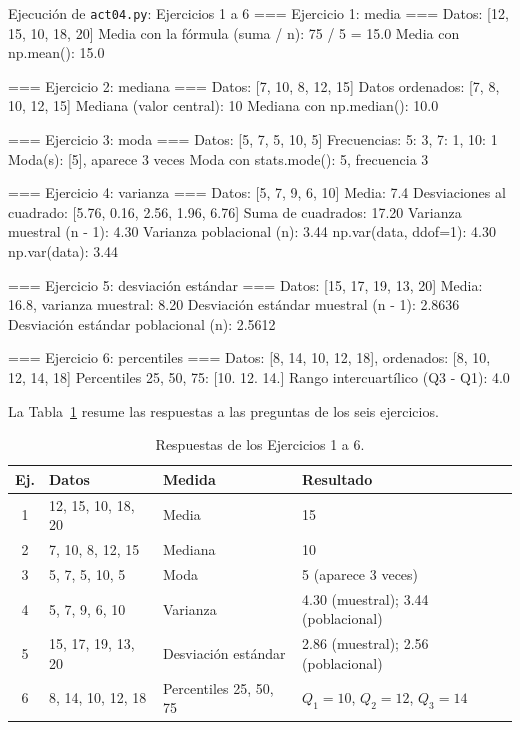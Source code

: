\documentclass[11pt,letterpaper]{article}
\begin{document}
\begin{consola}[label=out:ej16]{Ejecución de \texttt{act04.py}: Ejercicios 1 a 6}
=== Ejercicio 1: media ===
Datos: [12, 15, 10, 18, 20]
Media con la fórmula (suma / n): 75 / 5 = 15.0
Media con np.mean(): 15.0

=== Ejercicio 2: mediana ===
Datos: [7, 10, 8, 12, 15]
Datos ordenados: [7, 8, 10, 12, 15]
Mediana (valor central): 10
Mediana con np.median(): 10.0

=== Ejercicio 3: moda ===
Datos: [5, 7, 5, 10, 5]
Frecuencias: {5: 3, 7: 1, 10: 1}
Moda(s): [5], aparece 3 veces
Moda con stats.mode(): 5, frecuencia 3

=== Ejercicio 4: varianza ===
Datos: [5, 7, 9, 6, 10]
Media: 7.4
Desviaciones al cuadrado: [5.76, 0.16, 2.56, 1.96, 6.76]
Suma de cuadrados: 17.20
Varianza muestral (n - 1): 4.30
Varianza poblacional (n):  3.44
np.var(data, ddof=1): 4.30   np.var(data): 3.44

=== Ejercicio 5: desviación estándar ===
Datos: [15, 17, 19, 13, 20]
Media: 16.8, varianza muestral: 8.20
Desviación estándar muestral (n - 1): 2.8636
Desviación estándar poblacional (n):  2.5612

=== Ejercicio 6: percentiles ===
Datos: [8, 14, 10, 12, 18], ordenados: [8, 10, 12, 14, 18]
Percentiles 25, 50, 75: [10. 12. 14.]
Rango intercuartílico (Q3 - Q1): 4.0
\end{consola}

La Tabla~\ref{tab:ejercicios} resume las respuestas a las preguntas de los seis ejercicios.

\begin{table}[htbp]
\centering
\caption{Respuestas de los Ejercicios 1 a 6.}
\label{tab:ejercicios}
\begin{tabular}{clll}
\hline
\textbf{Ej.} & \textbf{Datos} & \textbf{Medida} & \textbf{Resultado} \\
\hline
1 & 12, 15, 10, 18, 20 & Media & 15 \\
2 & 7, 10, 8, 12, 15 & Mediana & 10 \\
3 & 5, 7, 5, 10, 5 & Moda & 5 (aparece 3 veces) \\
4 & 5, 7, 9, 6, 10 & Varianza & 4.30 (muestral); 3.44 (poblacional) \\
5 & 15, 17, 19, 13, 20 & Desviación estándar & 2.86 (muestral); 2.56 (poblacional) \\
6 & 8, 14, 10, 12, 18 & Percentiles 25, 50, 75 & $Q_1 = 10$, $Q_2 = 12$, $Q_3 = 14$ \\
\hline
\end{tabular}
\end{table}
\end{document}
